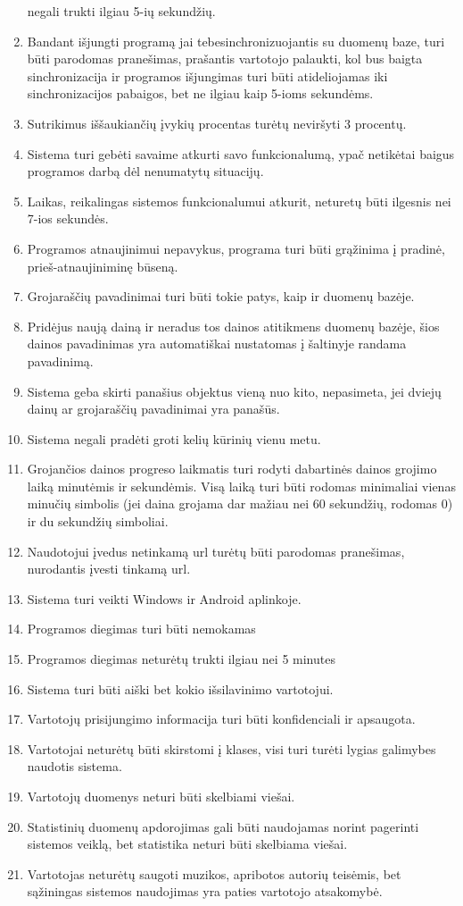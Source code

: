 \documentclass{VUMIFPSkursinis}
\begin{document}
\begin{enumerate}[start=1,label={\bfseries NFR\arabic*}]
negali trukti ilgiau 5-ių sekundžių.
\item Bandant išjungti programą jai tebesinchronizuojantis su duomenų baze, turi būti parodomas pranešimas, prašantis vartotojo palaukti, kol bus baigta sinchronizacija ir programos 
išjungimas turi būti atideliojamas iki sinchronizacijos pabaigos, bet ne ilgiau kaip 5-ioms sekundėms. 
\item Sutrikimus iššaukiančių įvykių procentas turėtų neviršyti 3 procentų. 
\item Sistema turi gebėti savaime atkurti savo funkcionalumą, ypač netikėtai baigus programos darbą dėl nenumatytų situacijų. 
\item Laikas, reikalingas sistemos funkcionalumui atkurit, neturetų būti ilgesnis nei 7-ios sekundės.
\item Programos atnaujinimui nepavykus, programa turi būti grąžinima į pradinė, prieš-atnaujiniminę būseną.
\item Grojaraščių pavadinimai turi būti tokie patys, kaip ir duomenų bazėje. 
\item Pridėjus naują dainą ir neradus tos dainos atitikmens duomenų bazėje, šios dainos pavadinimas yra automatiškai nustatomas į šaltinyje randama pavadinimą. 
\item Sistema geba skirti panašius objektus vieną nuo kito, nepasimeta, jei dviejų dainų ar grojaraščių pavadinimai yra panašūs.
\item Sistema negali pradėti groti kelių kūrinių vienu metu.
\item Grojančios dainos progreso laikmatis turi rodyti dabartinės dainos grojimo laiką minutėmis ir sekundėmis. Visą laiką turi būti rodomas minimaliai vienas minučių simbolis 
(jei daina grojama dar mažiau nei 60 sekundžių, rodomas 0) ir du sekundžių simboliai. 
\item Naudotojui įvedus netinkamą url turėtų būti parodomas pranešimas, nurodantis įvesti tinkamą url. 
\item Sistema turi veikti Windows ir Android aplinkoje.
\item Programos diegimas turi būti nemokamas
\item Programos diegimas neturėtų trukti ilgiau nei 5 minutes
\item Sistema turi būti aiški bet kokio išsilavinimo vartotojui.
\item Vartotojų prisijungimo informacija turi būti konfidenciali ir apsaugota.
\item Vartotojai neturėtų būti skirstomi į klases, visi turi turėti lygias galimybes naudotis sistema.
\item Vartotojų duomenys neturi būti skelbiami viešai.
\item Statistinių duomenų apdorojimas gali būti naudojamas norint pagerinti sistemos veiklą, bet statistika neturi būti skelbiama viešai.
\item Vartotojas neturėtų saugoti muzikos, apribotos autorių teisėmis, bet sąžiningas sistemos naudojimas yra paties vartotojo atsakomybė.
\end{enumerate}
\end{document}
